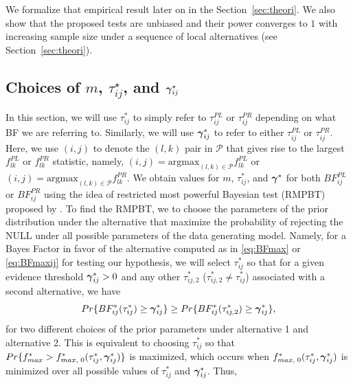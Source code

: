 \documentclass[times,sort&compress,3p]{elsarticle}
\theoremstyle{plain}%
\theoremstyle{definition}
\def\boldpsi{{\mbox{\boldmath $\psi$}}}
\newcommand{\ugamma}            {\mbox{\boldmath$\gamma$}}
\begin{document}
We formalize that empirical result later on in the Section~\ref{sec:theori}. %
We also show that the proposed tests are unbiased and their power converges to $1$ with increasing sample size under a sequence of local alternatives (see Section~\ref{sec:theori}).  

\subsection{Choices of $m$, $\tau^{\star}_{ij}$, and $\ugamma^{\star}_{ij}$} \label{sec:testmtaugam}
In this section, we will use $\tau^{*}_{ij}$ to simply refer to $\tau^{PL}_{ij}$ or $\tau^{PR}_{ij}$ depending on what BF we are referring to. Similarly, we will use $\ugamma^{*}_{ij}$ to refer to either $\tau^{PL}_{ij}$ or $\tau^{PR}_{ij}$. 
Here, we use $(i, j)$ to denote the $(l, k)$ pair in $\mathcal{P}$ that gives rise to the largest $f_{lk}^{PL}$ or $f_{lk}^{PR}$ statistic, namely, $(i, j) = \mathrm{argmax}_{(l, k)\in\mathcal{P}}f_{lk}^{PL}$ or $(i, j) = \mathrm{argmax}_{(l, k)\in\mathcal{P}}f_{lk}^{PR}$. 
We obtain values for $m$, $\tau^{*}_{ij}$, and $\ugamma^{*}$ for both $BF^{PL}_{ij}$ or $BF^{PR}_{ij}$ using the idea of restricted most powerful Bayesian test (RMPBT) proposed by \cite{GoddardJohnson,Goddard}. To find the RMPBT, we to choose the parameters of the prior distribution under the alternative that maximize the probability of rejecting the NULL under all possible parameters of the data generating model. Namely, for a Bayes Factor in favor of the alternative computed as in \eqref{eq:BFmax} or \eqref{eq:BFmaxij} for testing our hypothesis, we will select $\tau^{*}_{ij}$ so that for a given evidence threshold $\ugamma^{*}_{ij} > 0$ and any other $\tau^{*}_{ij,2}$ ($\tau^{*}_{ij,2} \neq \tau^{*}_{ij}$) associated with a second alternative, we have
$$Pr\{BF^{*}_{ij}(\tau^{*}_{ij}) \geq  \ugamma^{*}_{ij}\} \geq Pr\{BF^{*}_{ij}(\tau^{*}_{ij,2}) \geq \ugamma^{*}_{ij} \},$$
for two different choices of the prior parameters under alternative 1 and alternative 2.
This is equivalent to choosing $\tau^{*}_{ij}$ so that $Pr\{f^{*}_{max} > f^{*}_{max,\;0}(\tau^{*}_{ij},\ugamma^{*}_{ij})\}$ is maximized, which occurs when $f^{*}_{max,\;0}(\tau^{*}_{ij},\ugamma^{*}_{ij})$ is minimized over all possible values of $\tau^{*}_{ij}$ and $\ugamma^{*}_{ij}$. Thus, 
\end{document}
